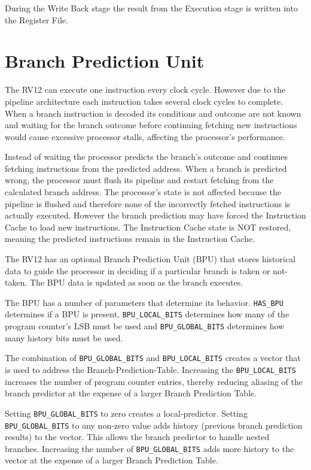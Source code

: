 During the Write Back stage the result from the Execution stage is written into the Register File.

\section{Branch Prediction Unit} \label{branch-prediction-unit}

The RV12 can execute one instruction every clock cycle. 
However due to the pipeline architecture each instruction takes several clock cycles to complete. 
When a branch instruction is decoded its conditions and outcome are not known and waiting for the branch outcome before continuing fetching new instructions would cause excessive processor stalls, affecting the processor's performance.

Instead of waiting the processor predicts the branch's outcome and continues fetching instructions from the predicted address.
When a branch is predicted wrong, the processor must flush its pipeline and restart fetching from the calculated branch address. 
The processor's state is not affected because the pipeline is flushed and therefore none of the incorrectly fetched instructions is actually executed. 
However the branch prediction may have forced the Instruction Cache to load new instructions. 
The Instruction Cache state is NOT restored, meaning the predicted instructions remain in the Instruction Cache.

The RV12 has an optional Branch Prediction Unit (BPU) that stores historical data to guide the processor in deciding if a particular branch is taken or not-taken. 
The BPU data is updated as soon as the branch executes.

The BPU has a number of parameters that determine its behavior. \texttt{HAS\_BPU}
determines if a BPU is present, \texttt{BPU\_LOCAL\_BITS} determines how many of
the program counter's LSB must be used and  \texttt{BPU\_GLOBAL\_BITS}  determines
how many history bits must be used.

The combination of \texttt{BPU\_GLOBAL\_BITS} and \texttt{BPU\_LOCAL\_BITS} creates a
vector that is used to address the Branch-Prediction-Table. Increasing
the \texttt{BPU\_LOCAL\_BITS} increases the number of program counter entries,
thereby reducing aliasing of the branch predictor at the expense of a
larger Branch Prediction Table.

Setting \texttt{BPU\_GLOBAL\_BITS} to zero creates a local-predictor. Setting
\texttt{BPU\_GLOBAL\_BITS} to any non-zero value adds history (previous branch
prediction results) to the vector. This allows the branch predictor to
handle nested branches. Increasing the number of \texttt{BPU\_GLOBAL\_BITS} adds
more history to the vector at the expense of a larger Branch Prediction
Table.

